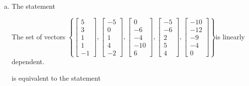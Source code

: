 \begin{exerciseAnswer}
\begin{enumerate}[(a)]
\item The statement 
\begin{center}\begin{minipage}{0.8\textwidth}
 The set of vectors \( \left\{ \left[\begin{array}{c}
5 \\
3 \\
1 \\
1 \\
-1
\end{array}\right] , \left[\begin{array}{c}
-5 \\
0 \\
1 \\
4 \\
-2
\end{array}\right] , \left[\begin{array}{c}
0 \\
-6 \\
-4 \\
-10 \\
6
\end{array}\right] , \left[\begin{array}{c}
-5 \\
-6 \\
2 \\
5 \\
4
\end{array}\right] , \left[\begin{array}{c}
-10 \\
-12 \\
-9 \\
-4 \\
0
\end{array}\right] \right\} \)is linearly dependent.
\end{minipage}\end{center}
     is equivalent to the statement 
\begin{center}\begin{minipage}{0.8\textwidth}
 The vector equation \( x_{1} \left[\begin{array}{c}
5 \\
3 \\
1 \\
1 \\
-1
\end{array}\right] + x_{2} \left[\begin{array}{c}
-5 \\
0 \\

\end{array}
\end{minipage}
\end{center}
\end{enumerate}
\end{exerciseAnswer}
